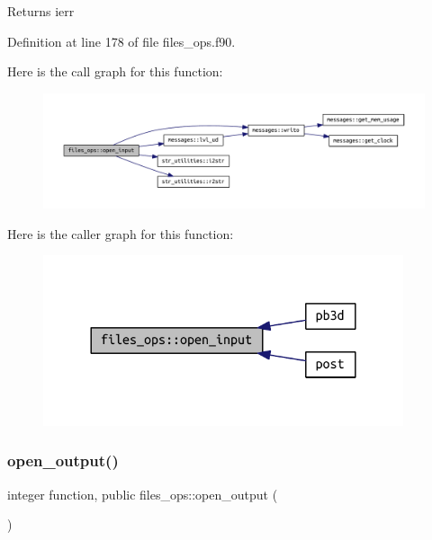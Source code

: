 \begin{DoxyReturn}{Returns}
ierr 
\end{DoxyReturn}


Definition at line 178 of file files\+\_\+ops.\+f90.

Here is the call graph for this function\+:\nopagebreak
\begin{figure}[H]
\begin{center}
\leavevmode
\includegraphics[width=350pt]{namespacefiles__ops_a63a81a5a451f787025429878b2cec81b_cgraph}
\end{center}
\end{figure}
Here is the caller graph for this function\+:\nopagebreak
\begin{figure}[H]
\begin{center}
\leavevmode
\includegraphics[width=300pt]{namespacefiles__ops_a63a81a5a451f787025429878b2cec81b_icgraph}
\end{center}
\end{figure}
\mbox{\label{namespacefiles__ops_ad681a9e8083a6f664cf0f9d17ebe279c}} 
\subsubsection{\texorpdfstring{open\+\_\+output()}{open\_output()}}
{\footnotesize\ttfamily integer function, public files\+\_\+ops\+::open\+\_\+output (\begin{DoxyParamCaption}{ }\end{DoxyParamCaption})}



